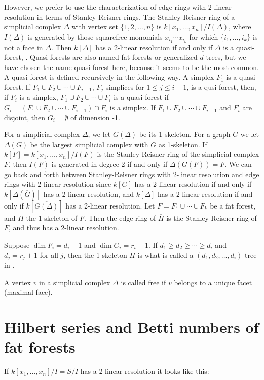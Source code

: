 \documentclass[11pt, oneside]{article}   	%
\begin{document}
However, we prefer to use the characterization of edge rings with 2-linear resolution in terms of Stanley-Reisner rings.
The Stanley-Reisner ring of a simplicial complex $\Delta$ with vertex set $\{ 1,2,\ldots,n\}$ is $k[x_1,\ldots,x_n]/I(\Delta)$, where $I(\Delta)$ is
generated by those squarefree monomials $x_{i_1}\cdots x_{i_k}$ for which
$\{ i_1,\ldots,i_k\}$ is not a face in $\Delta$. Then $k[\Delta]$ has a 2-linear resolution if and only if $\Delta$ is a quasi-forest, \cite{f1,f2}. 
Quasi-forests are also named fat forests or generalized $d$-trees, but we have chosen the name quasi-forest here, because it seems to be the most common. A quasi-forest
is defined recursively in the following way. A simplex $F_1$ is a quasi-forest. If $F_1\cup F_2\cup\cdots\cup F_{i-1}$, $F_j$ simplices for $1\le j\le i-1$, is a 
qusi-forest, then, if $F_i$ is a simplex, $F_1\cup F_2\cup\cdots\cup F_i$ is a quasi-forest if $G_i=(F_1\cup F_2\cup\cdots\cup F_{i-1})\cap F_i$ is a simplex.
If $F_1\cup F_2\cup\cdots\cup F_{i-1}$ and $F_i$ are disjoint, then $G_i=\emptyset$ of dimension -1.

For a simplicial complex $\Delta$, we let $G(\Delta)$ be its 1-skeleton. For a graph $G$ we let $\Delta(G)$ be the largest simplicial complex with
$G$ as 1-skeleton. If $k[F]=k[x_1,\ldots,x_n]/I(F)$ is the Stanley-Reisner ring of the simplicial complex $F$, then $I(F)$ is generated in degree 2
if and only if $\Delta(G(F))=F$. We can go back and forth between Stanley-Reisner rings with 2-linear resolution and edge rings with 2-linear resolution since 
$k[G]$ has a 2-linear resolution if and only if $k[\Delta(\overline G)]$ has a 2-linear resolution, and $k[\Delta]$ has a 2-linear resolution if and only if
$k[\overline{G(\Delta)}]$ has a 2-linear resolution.
Let $F=F_1\cup\cdots\cup F_k$ be a fat forest, and $H$ the 1-skeleton of $F$. Then the edge ring of $\overline H$ is the Stanley-Reisner ring of $F$,
and thus has a 2-linear resolution. 

Suppose $\dim F_i=d_i-1$ and $\dim G_i=r_i-1$. If $d_1\ge d_2\ge\cdots\ge d_i$ and $d_j=r_j+1$ for all $j$, then the 1-skeleton $H$ 
is what is called a $(d_1,d_2,\ldots,d_i)$-tree in \cite{a-m-n}. 

A vertex $v$ in a simplicial complex $\Delta$ is called free if $v$ belongs to a unique facet (maximal face). 

\section{Hilbert series and Betti numbers of fat forests}
If $k[x_1,\ldots,x_n]/I=S/I$ has a 2-linear resolution it looks like this:
\end{document}
